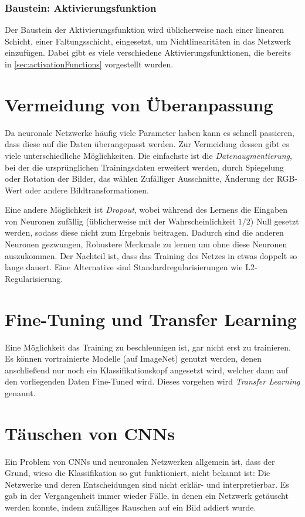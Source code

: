 			\subsubsection{Baustein: Aktivierungsfunktion}
				Der Baustein der Aktivierungsfunktion wird üblicherweise nach einer linearen Schicht, \bzw einer Faltungsschicht, eingesetzt, um Nichtlinearitäten in das Netzwerk einzufügen. Dabei gibt es viele verschiedene Aktivierungsfunktionen, die bereits in \autoref{sec:activationFunctions} vorgestellt wurden.

	\section{Vermeidung von Überanpassung}
		Da neuronale Netzwerke häufig viele Parameter haben kann es schnell passieren, dass diese auf die Daten überangepasst werden. Zur Vermeidung dessen gibt es viele unterschiedliche Möglichkeiten. Die einfachste ist die \emph{Datenaugmentierung}, bei der die ursprünglichen Trainingsdaten erweitert werden, \bspw durch Spiegelung oder Rotation der Bilder, das wählen Zufälliger Ausschnitte, Änderung der RGB-Wert oder andere Bildtransformationen.

		Eine andere Möglichkeit ist \emph{Dropout}, wobei während des Lernens die Eingaben von Neuronen zufällig (üblicherweise mit der Wahrscheinlichkeit \(1/2\)) Null gesetzt werden, sodass diese nicht zum Ergebnis beitragen. Dadurch sind die anderen Neuronen gezwungen, Robustere Merkmale zu lernen um ohne diese Neuronen auszukommen. Der Nachteil ist, dass das Training des Netzes in etwas doppelt so lange dauert. Eine Alternative sind Standardregularisierungen wie \zB L2-Regularisierung.

	\section{Fine-Tuning und Transfer Learning}
		Eine Möglichkeit das Training zu beschleunigen ist, gar nicht erst zu trainieren. Es können vortrainierte Modelle (\zB auf ImageNet) genutzt werden, denen anschließend nur noch ein Klassifikationskopf angesetzt wird, welcher dann auf den vorliegenden Daten Fine-Tuned wird. Dieses vorgehen wird \emph{Transfer Learning} genannt.

	\section{Täuschen von CNNs}
		Ein Problem von CNNs und neuronalen Netzwerken allgemein ist, dass der Grund, wieso die Klassifikation so gut funktioniert, nicht bekannt ist: Die Netzwerke und deren Entscheidungen sind nicht erklär- und interpretierbar. Es gab in der Vergangenheit immer wieder Fälle, in denen ein Netzwerk getäuscht werden konnte, indem \bspw zufälliges Rauschen auf ein Bild addiert wurde.

